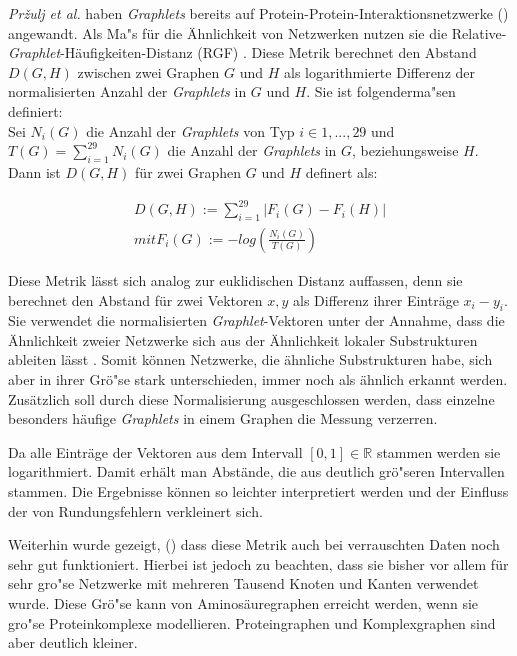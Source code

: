 \documentclass{report}
\begin{document}
\textit{Pr\v{z}ulj et al.} haben \textit{Graphlets} bereits auf Protein-Protein-Interaktionsnetzwerke (\cite{frqdistribution}) angewandt. Als Ma"s f\"ur die \"Ahnlichkeit von Netzwerken nutzen sie die Relative-\textit{Graphlet}-H\"aufigkeiten-Distanz (RGF) . Diese Metrik berechnet den Abstand $D(G,H)$ zwischen zwei Graphen $G$ und $H$ als logarithmierte Differenz der normalisierten Anzahl der \textit{Graphlets} in $G$ und $H$. Sie ist folgenderma"sen definiert: \\

Sei $N_{i}(G)$ die Anzahl der \textit{Graphlets} von Typ $i \in {1,...,29}$ und \\ $T(G) = \sum_{i = 1}^{29} N_{i}(G)$ die Anzahl der \textit{Graphlets} in $G$, beziehungsweise $H$.\\

Dann ist $D(G,H)$ f\"ur zwei Graphen $G$ und $H$ definert als:

\begin{subequations}
\begin{align}
D(G,H) := \sum_{i = 1}^{29} | F_{i}(G) - F_{i}(H) | \\
mit F_{i}(G) := - log(\frac{N_{i}(G)}{T(G)})
\end{align}
\end{subequations}



Diese Metrik l\"asst sich analog zur euklidischen Distanz auffassen, denn sie berechnet den Abstand f\"ur zwei Vektoren $x,y$ als Differenz ihrer Eintr\"age $x_i -y_i$. Sie verwendet die normalisierten \textit{Graphlet}-Vektoren unter der Annahme, dass die \"Ahnlichkeit zweier Netzwerke sich aus der \"Ahnlichkeit lokaler Substrukturen ableiten l\"asst \cite{frqdistribution}. Somit k\"onnen Netzwerke, die \"ahnliche Substrukturen habe, sich aber in ihrer Gr\"o"se stark unterschieden, immer noch als \"ahnlich erkannt werden. Zus\"atzlich soll durch diese Normalisierung ausgeschlossen werden, dass einzelne besonders h\"aufige \textit{Graphlets} in einem Graphen die Messung verzerren.

Da alle Eintr\"age der Vektoren aus dem Intervall $ [0,1] \in \mathbb{R} $ stammen werden sie logarithmiert. Damit erh\"alt man Abst\"ande, die aus deutlich gr\"o"seren Intervallen stammen. Die Ergebnisse k\"onnen so leichter interpretiert werden und der Einfluss der von Rundungsfehlern verkleinert sich.
 
Weiterhin wurde gezeigt, (\cite{frqdistribution}) dass diese Metrik auch bei verrauschten Daten noch sehr gut funktioniert. Hierbei ist jedoch zu beachten, dass sie bisher vor allem f\"ur sehr gro"se Netzwerke mit mehreren Tausend Knoten und Kanten verwendet wurde. Diese Gr\"o"se kann von Aminos\"auregraphen erreicht werden, wenn sie gro"se Proteinkomplexe modellieren. Proteingraphen und Komplexgraphen sind aber deutlich kleiner.
\end{document}
